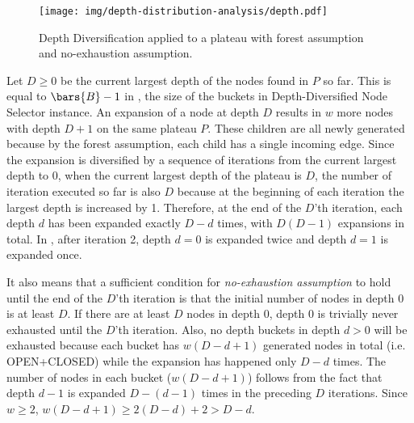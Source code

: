 \begin{figure}[htbp]
  \centering
  \texttt{[image: img/depth-distribution-analysis/depth.pdf]}
 \label{fig:depth-distribution-analysis}
 \caption{Depth Diversification applied to a plateau 
with forest assumption and no-exhaustion assumption.}
\end{figure}

Let $D\geq 0$ be the current largest depth of the nodes found in $P$ so far.
This is equal to $\bars{B}-1$ in ,
the size of the buckets in Depth-Diversified Node Selector instance.
An expansion of a node at depth $D$ results in $w$ more nodes with depth $D+1$ on the same plateau $P$.
These children are all newly generated because by the forest assumption, each child has a single incoming edge.
Since the expansion is
diversified by a sequence of iterations from the current largest depth to 0, when the current
largest depth of the plateau is $D$, the number of iteration executed so far is also $D$ because
at the beginning of each iteration the largest depth is increased by 1.
Therefore, at the end of the $D$'th iteration,
each depth $d$ has been expanded exactly $D-d$ times, with $D(D-1)$ expansions in total.
In ,
after iteration 2, depth $d=0$ is expanded twice and depth $d=1$ is expanded once.

It also means that a sufficient condition for \emph{no-exhaustion assumption} to hold until the end of the $D$'th
iteration is that the initial number of nodes in depth 0 is at least $D$.  If there are at least $D$ nodes in depth
0, depth 0 is trivially never exhausted until the $D$'th iteration. Also, no depth buckets in depth $d>0$ will be exhausted 
because each bucket has $w(D-d+1)$ generated nodes in total (i.e. OPEN+CLOSED) while the expansion has
happened only $D-d$ times.
The number of nodes in each bucket ($w(D-d+1)$) follows from the fact that  depth $d-1$ is expanded $D-(d-1)$ times in the preceding $D$ iterations.
Since $w\geq 2$, $w(D-d+1)\geq 2(D-d)+2>D-d$.

